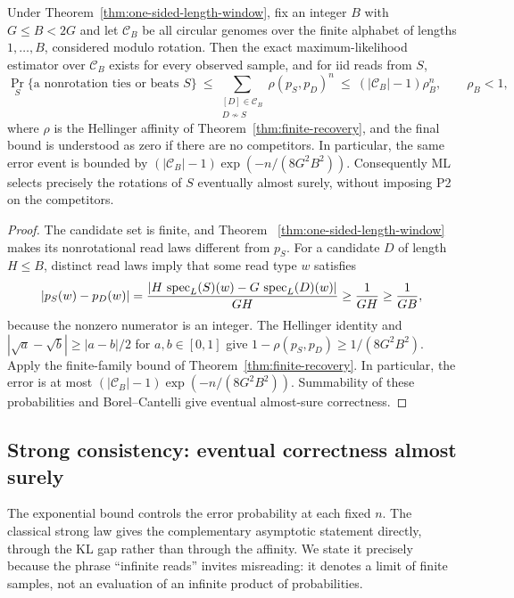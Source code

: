 \begin{corollary}
\label{cor:length-window-ML}
Under Theorem~\ref{thm:one-sided-length-window}, fix an integer
$B$ with $G\le B<2G$ and let $\mathcal C_B$ be
all circular genomes over the finite alphabet of lengths
$1,\ldots,B$, considered modulo rotation. Then the exact
maximum-likelihood estimator over $\mathcal C_B$ exists for
every observed sample, and for iid reads from $S$,
\[
 \Pr_S\{\text{a nonrotation ties or beats }S\}
 \ \le\!
 \sum_{\substack{[D]\in\mathcal C_B\\D\not\sim S}}
        \rho(p_S,p_D)^n
 \ \le\ (|\mathcal C_B|-1)\rho_B^n ,
 \qquad \rho_B<1,
\]
where $\rho$ is the Hellinger affinity of
Theorem~\ref{thm:finite-recovery}, and the final bound is
understood as zero if there are no competitors.
In particular, the same error event is bounded by
$(|\mathcal C_B|-1)\exp(-n/(8G^2B^2))$. Consequently
ML selects precisely the rotations of $S$ eventually almost
surely, without imposing P2 on the competitors.
\end{corollary}
\begin{proof}
The candidate set is finite, and Theorem~
\ref{thm:one-sided-length-window} makes its nonrotational
read laws different from $p_S$. For a candidate $D$ of
length $H\le B$, distinct read laws imply that some
read type $w$ satisfies
\[
|p_S(w)-p_D(w)| =
\frac{|H\,\operatorname{spec}_L(S)(w)-G\,\operatorname{spec}_L(D)(w)|}{GH}
\ge\frac1{GH}\ge\frac1{GB},
\]
because the nonzero numerator is an integer.
The Hellinger identity and
$|\sqrt a-\sqrt b|\ge|a-b|/2$ for $a,b\in[0,1]$
give $1-\rho(p_S,p_D)\ge1/(8G^2B^2)$.
Apply the finite-family bound of
Theorem~\ref{thm:finite-recovery}.
In particular, the error is at most
$(|\mathcal C_B|-1)\exp(-n/(8G^2B^2))$.
Summability of these probabilities and
Borel--Cantelli give eventual almost-sure correctness.
\end{proof}

\subsection{Strong consistency: eventual correctness almost surely}
\label{sec:strong-consistency}

The exponential bound controls the error probability at each fixed $n$.
The classical strong law gives the complementary asymptotic statement
directly, through the KL gap rather than through the affinity. We state it
precisely because the phrase ``infinite reads'' invites misreading: it
denotes a limit of finite samples, not an evaluation of an infinite product
of probabilities.

